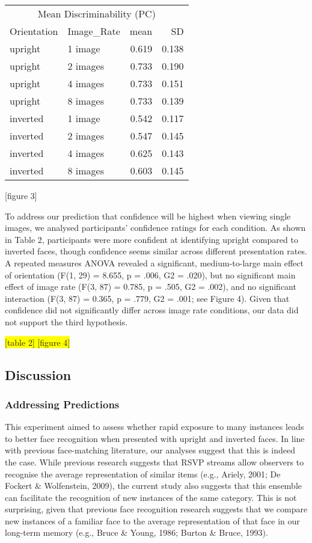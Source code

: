 \documentclass[
  english,
  man]{apa6}
\begin{document}
\begin{tabular}{l|l|r|r}
\hline
\multicolumn{4}{c|}{Mean Discriminability (PC)} \\
\cline{1-4}
Orientation & Image\_Rate & mean & SD\\
\hline
upright & 1 image & 0.619 & 0.138\\
\hline
upright & 2 images & 0.733 & 0.190\\
\hline
upright & 4 images & 0.733 & 0.151\\
\hline
upright & 8 images & 0.733 & 0.139\\
\hline
inverted & 1 image & 0.542 & 0.117\\
\hline
inverted & 2 images & 0.547 & 0.145\\
\hline
inverted & 4 images & 0.625 & 0.143\\
\hline
inverted & 8 images & 0.603 & 0.145\\
\hline
\end{tabular}

{[}figure 3{]}

To address our prediction that confidence will be highest when viewing single images, we analysed participants' confidence ratings for each condition. As shown in Table 2, participants were more confident at identifying upright compared to inverted faces, though confidence seems similar across different presentation rates. A repeated measures ANOVA revealed a significant, medium-to-large main effect of orientation (F(1, 29) = 8.655, p = .006, G2 = .020), but no significant main effect of image rate (F(3, 87) = 0.785, p = .505, G2 = .002), and no significant interaction (F(3, 87) = 0.365, p = .779, G2 = .001; see Figure 4). Given that confidence did not significantly differ across image rate conditions, our data did not support the third hypothesis.

\colorbox{yellow}{[table 2]
[figure 4]}

\hypertarget{discussion}{%
\subsection{Discussion}\label{discussion}}

\hypertarget{addressing-predictions}{%
\subsubsection{Addressing Predictions}\label{addressing-predictions}}

This experiment aimed to assess whether rapid exposure to many instances leads to better face recognition when presented with upright and inverted faces. In line with previous face-matching literature, our analyses suggest that this is indeed the case. While previous research suggests that RSVP streams allow observers to recognise the average representation of similar items (e.g., Ariely, 2001; De Fockert \& Wolfenstein, 2009), the current study also suggests that this ensemble can facilitate the recognition of new instances of the same category. This is not surprising, given that previous face recognition research suggests that we compare new instances of a familiar face to the average representation of that face in our long-term memory (e.g., Bruce \& Young, 1986; Burton \& Bruce, 1993).
\end{document}
